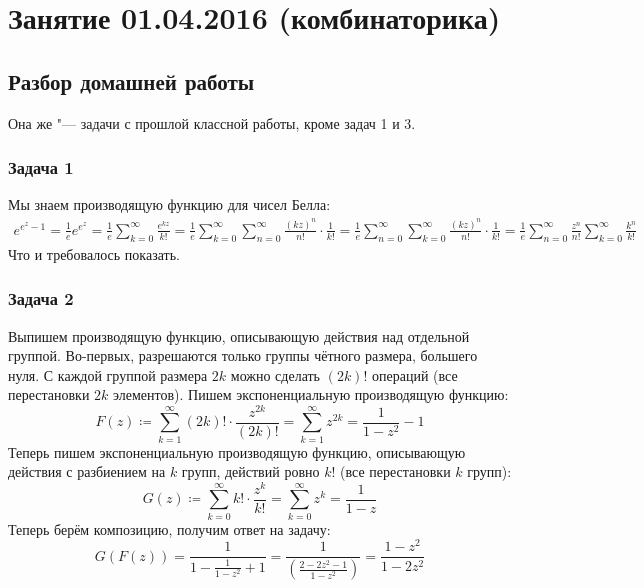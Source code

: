 \chapter{Занятие 01.04.2016 (комбинаторика)}
\section{Разбор домашней работы}
Она же "--- задачи с прошлой классной работы, кроме задач 1 и 3.

\subsection{Задача 1}
	Мы знаем производящую функцию для чисел Белла:
	\begin{gather*}
		e^{e^z-1} =
		\frac1e e^{e^z} =
		\frac1e \sum_{k=0}^{\infty} \frac{e^{kz}}{k!} =
		\frac1e \sum_{k=0}^{\infty} \sum_{n=0}^{\infty} \frac{(kz)^n}{n!} \cdot \frac{1}{k!} =
		\frac1e \sum_{n=0}^{\infty} \sum_{k=0}^{\infty} \frac{(kz)^n}{n!} \cdot \frac{1}{k!} =
		\frac1e \sum_{n=0}^{\infty} \frac{z^n}{n!} \sum_{k=0}^{\infty} \frac{k^n}{k!}
	\end{gather*}
	Что и требовалось показать.

\subsection{Задача 2}
	Выпишем производящую функцию, описывающую действия над отдельной группой.
	Во-первых, разрешаются только группы чётного размера, большего нуля.
	С каждой группой размера $2k$ можно сделать $(2k)!$ операций (все перестановки $2k$ элементов).
	Пишем экспоненциальную производящую функцию:
	\[
		F(z) \coloneq \sum_{k=1}^\infty (2k)! \cdot \frac{z^{2k}}{(2k)!} = \sum_{k=1}^\infty z^{2k} = \frac{1}{1-z^2} - 1
	\]
	Теперь пишем экспоненциальную производящую функцию, описывающую действия с разбиением на $k$ групп,
	действий ровно $k!$ (все перестановки $k$ групп):
	\[
		G(z) \coloneq \sum_{k=0}^\infty k! \cdot \frac{z^k}{k!} = \sum_{k=0}^\infty z^k = \frac{1}{1 - z}
	\]
	Теперь берём композицию, получим ответ на задачу:
	\[
		G(F(z)) = \frac{1}{1-\frac{1}{1-z^2}+1} = \frac{1}{\left(\frac{2-2z^2-1}{1-z^2}\right)} = \frac{1-z^2}{1-2z^2}
	\]

